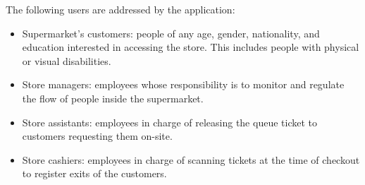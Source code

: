 \documentclass[../../main.tex]{subfiles}
\begin{document}
	The following users are addressed by the application:
	\begin{itemize}
		\item Supermarket's customers: people of any age, gender, nationality, and education interested in accessing the store. This includes people with physical or visual disabilities.
		\item Store managers: employees whose responsibility is to monitor and regulate the flow of people inside the supermarket.
		\item Store assistants: employees in charge of releasing the queue ticket to customers requesting them on-site.
		\item Store cashiers: employees in charge of scanning tickets at the time of checkout to register exits of the customers.
	\end{itemize}
\end{document}
